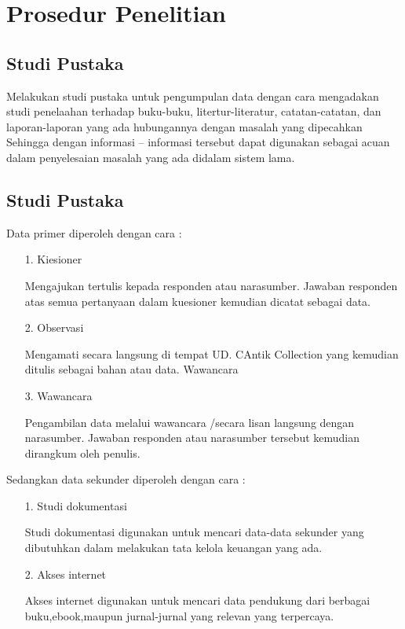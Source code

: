 \documentclass{jtetiproposalskripsi}
\begin{document}
\section{Prosedur Penelitian}
\subsection{Studi Pustaka}

Melakukan studi pustaka untuk pengumpulan data dengan cara mengadakan studi penelaahan terhadap buku-buku, litertur-literatur, catatan-catatan, dan laporan-laporan yang ada hubungannya dengan masalah yang dipecahkan Sehingga dengan informasi – informasi tersebut dapat digunakan sebagai acuan dalam penyelesaian masalah yang ada didalam sistem lama.

\subsection{Studi Pustaka}

Data primer diperoleh dengan cara :
\begin{itemize}
\item[1.]Kiesioner

Mengajukan tertulis kepada responden atau narasumber. Jawaban responden atas semua pertanyaan dalam kuesioner kemudian dicatat sebagai data.

\item[2.]Observasi

Mengamati secara langsung di tempat UD. CAntik Collection yang kemudian ditulis sebagai bahan atau data. Wawancara

\item[3.] Wawancara

Pengambilan data melalui wawancara /secara lisan langsung dengan narasumber. Jawaban responden atau narasumber tersebut kemudian dirangkum oleh penulis. 
\end{itemize}

Sedangkan data sekunder diperoleh dengan cara :

\begin{itemize}
\item[1.]Studi dokumentasi

Studi dokumentasi digunakan untuk mencari data-data sekunder yang dibutuhkan dalam melakukan tata kelola keuangan yang ada.

\item[2.]Akses internet

Akses internet digunakan untuk mencari data pendukung dari berbagai buku,ebook,maupun jurnal-jurnal yang relevan yang terpercaya.
\end{itemize}
\end{document}
